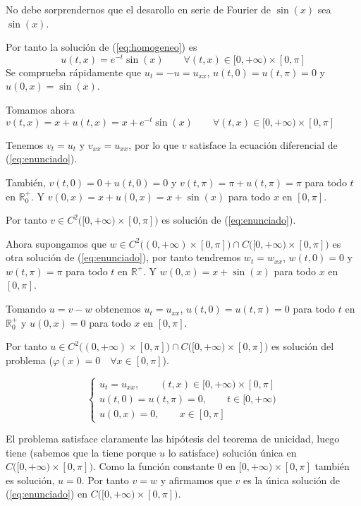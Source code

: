 \documentclass[a4]{article}
\begin{document}
No debe sorprendernos que el desarollo en serie de Fourier de
$\sin(x)$ sea $\sin(x)$.

Por tanto la solución de (\ref{eq:homogeneo}) es
\begin{equation} \label{eq:u}
  u(t,x)=e^{-t}\sin(x)\qquad\forall(t,x)\in[0,+\infty)\times [0,\pi]
\end{equation}
Se comprueba rápidamente que $u_t=-u=u_{xx}$, $u(t,0)=u(t,\pi)=0$ y
$u(0,x)=\sin(x)$.

\newpage

Tomamos ahora $v(t,x)=x+u(t,x)=x+e^{-t}\sin(x)\qquad\forall(t,x)\in[0,+\infty)\times [0,\pi]$

Tenemos $v_t=u_t$ y $v_{xx}=u_{xx}$, por lo que $v$ satisface la
ecuación diferencial de (\ref{eq:enunciado}).

También, $v(t,0)=0+u(t,0)=0$ y $v(t,\pi)=\pi+u(t,\pi)=\pi$ para todo
$t$ en $\mathbb{R}^+_0$. Y $v(0,x)=x+u(0,x)=x+\sin(x)$ para todo $x$ en
$[0,\pi]$.

Por tanto $v\in C^2\big([0,+\infty)\times[0,\pi]\big)$ es solución de (\ref{eq:enunciado}).

\vspace{4mm}

Ahora supongamos que
$w\in C^2\big((0,+\infty)\times[0,\pi]\big)\cap
C\big([0,+\infty)\times[0,\pi]\big)$ es otra solución de
(\ref{eq:enunciado}), por tanto tendremos $w_t=w_{xx}$, $w(t,0)=0$ y
$w(t,\pi)=\pi$ para todo $t$ en $\mathbb{R}^+$. Y $w(0,x)=x+\sin(x)$
para todo $x$ en $[0,\pi]$.

Tomando $u=v-w$ obtenemos $u_t=u_{xx}$, $u(t,0)=u(t,\pi)=0$ para todo
$t$ en $\mathbb{R}^+_0$ y $u(0,x)=0$ para todo $x$ en $[0,\pi]$.

Por tanto $u\in C^2\big((0,+\infty)\times[0,\pi]\big)\cap
C\big([0,+\infty)\times[0,\pi]\big)$ es solución del
problema ($\varphi(x)=0\quad\forall x\in[0,\pi]$).

\begin{equation} \label{eq:nulo}
  \begin{cases}
    u_t=u_{xx}, \qquad (t,x)\in [0,+\infty)\times [0,\pi] \\
    u(t,0)=u(t,\pi)=0, \qquad t\in [0,+\infty) \\
    u(0,x)=0, \qquad x\in [0,\pi]
  \end{cases}
\end{equation}

El problema satisface claramente las hipótesis del teorema de
unicidad, luego tiene (sabemos que la tiene porque $u$ lo satisface)
solución única en $C\big([0,+\infty)\times[0,\pi]\big)$. Como la
función constante 0 en $[0,+\infty)\times[0,\pi]$ también es solución,
$u=0$. Por tanto $v=w$ y afirmamos que $v$ es la única solución de
(\ref{eq:enunciado}) en $C\big([0,+\infty)\times[0,\pi]\big)$.
\end{document}
